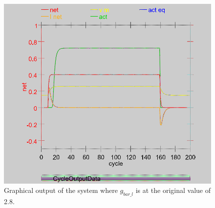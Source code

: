 \begin{figure}[H]
\centering
\includegraphics[scale=0.5]{Media/Main/EQ1/2.1.AG.png}
\caption{Graphical output of the system where $g_{bar\_l}$ is at the original value of 2.8.}
\label{Q2.30}
\end{figure}

\newpage

